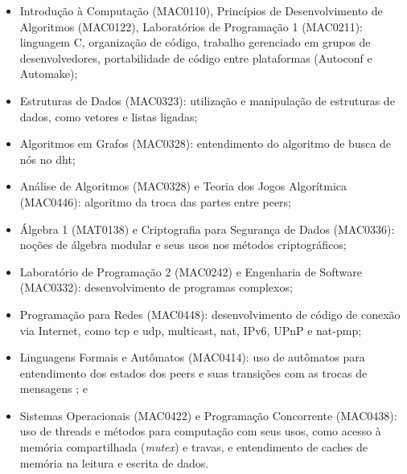 \begin{itemize}
    \item Introdução à Computação (MAC0110), Princípios de Desenvolvimento de Algoritmos
        (MAC0122), Laboratórios de Programação 1 (MAC0211): linguagem C, organização de
        código, trabalho gerenciado em grupos de desenvolvedores, portabilidade de
        código entre plataformas (Autoconf e Automake);

    \item Estruturas de Dados (MAC0323): utilização e manipulação de estruturas de
        dados, como vetores e listas ligadas;

    \item Algoritmos em Grafos (MAC0328): entendimento do algoritmo de busca de nós no
        \gls{dht};

    \item Análise de Algoritmos (MAC0328) e Teoria dos Jogos Algorítmica (MAC0446):
        algoritmo da troca das partes entre \glspl{peer};

    \item Álgebra 1 (MAT0138) e Criptografia para Segurança de Dados (MAC0336): noções
        de álgebra modular e seus usos nos métodos criptográficos;

    \item Laboratório de Programação 2 (MAC0242) e Engenharia de Software (MAC0332):
        desenvolvimento de programas complexos;

    \item Programação para Redes (MAC0448): desenvolvimento de código de conexão via
        Internet, como \gls{tcp} e \gls{udp}, multicast, \gls{nat}, IPv6, UPnP e
        \gls*{nat}-pmp;

    \item Linguagens Formais e Autômatos (MAC0414): uso de autômatos para entendimento
        dos estados dos \glspl*{peer} e suas transições com as trocas de mensagens
        \cite{conf:swarming}; e

    \item Sistemas Operacionais (MAC0422) e Programação Concorrente (MAC0438): uso de
        \glspl{thread} e métodos para computação com seus usos, como acesso à memória
        compartilhada (\emph{mutex}) e travas, e entendimento de caches de memória na
        leitura e escrita de dados.
\end{itemize}

\afterpage{\clearpage}